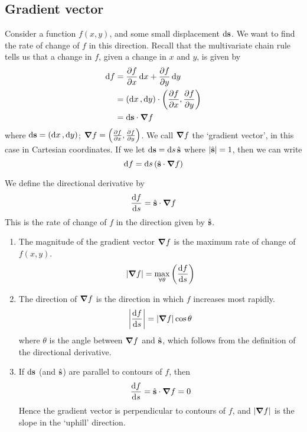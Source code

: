 \subsection{Gradient vector}
Consider a function \(f(x, y)\), and some small displacement \(\dd \vb s\).
We want to find the rate of change of \(f\) in this direction.
Recall that the multivariate chain rule tells us that a change in \(f\), given a change in \(x\) and \(y\), is given by
\begin{align*}
	\dd{f} & = \frac{\partial f}{\partial x} \dd{x} + \frac{\partial f}{\partial y}\dd{y}                         \\
	       & = (\dd{x}, \dd{y}) \cdot \left( \frac{\partial f}{\partial x}, \frac{\partial f}{\partial y} \right) \\
	       & = \dd \vb s \cdot \grad f
\end{align*}
where \(\dd \vb s = (\dd{x}, \dd{y})\); \(\grad f = \left( \frac{\partial f}{\partial x}, \frac{\partial f}{\partial y} \right)\).
We call \(\grad f\) the `gradient vector', in this case in Cartesian coordinates.
If we let \(\dd \vb s = \dd{s} \hat{\vb s}\) where \(\abs{\hat{\vb s}} = 1\), then we can write
\[
	\dd{f} = \dd{s} (\hat{\vb s}\cdot \grad f)
\]

We define the directional derivative by
\[
	\frac{\dd{f}}{\dd{s}} = \hat{\vb s} \cdot \grad f
\]
This is the rate of change of \(f\) in the direction given by \(\hat{\vb s}\).

\begin{enumerate}
	\item The magnitude of the gradient vector \(\grad f\) is the maximum rate of change of \(f(x, y)\).
	      \[
		      \abs{\grad f} = \max\limits_{\forall \theta} \left( \frac{\dd{f}}{\dd{s}} \right)
	      \]
	\item The direction of \(\grad f\) is the direction in which \(f\) increases most rapidly.
	      \[
		      \abs{\frac{\dd{f}}{\dd{s}}} = \abs{\grad f}\cos\theta
	      \]
	      where \(\theta\) is the angle between \(\grad f\) and \(\hat{\vb s}\), which follows from the definition of the directional derivative.
	\item If \(\dd \vb s\) (and \(\hat{\vb s}\)) are parallel to contours of \(f\), then
	      \[
		      \frac{\dd{f}}{\dd{s}} = \hat{\vb s} \cdot \grad f = 0
	      \]
	      Hence the gradient vector is perpendicular to contours of \(f\), and \(\abs{\grad f}\) is the slope in the `uphill' direction.
\end{enumerate}

